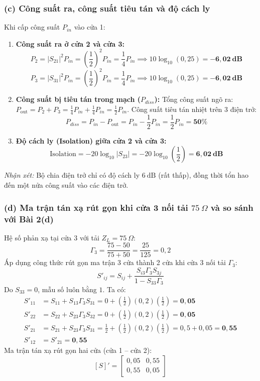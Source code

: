 \documentclass[12pt,a4paper]{article}
\begin{document}
\subsubsection{(c) Công suất ra, công suất tiêu tán và độ cách ly}
Khi cấp công suất $P_{in}$ vào cửa 1:
\begin{enumerate}
    \item \textbf{Công suất ra ở cửa 2 và cửa 3:}
    \[
    P_2 = |S_{21}|^2 P_{in} = \left(\frac{1}{2}\right)^2 P_{in} = \frac{1}{4} P_{in} \implies 10\log_{10}(0{,}25) = \mathbf{-6{,}02~\text{dB}}
    \]
    \[
    P_3 = |S_{31}|^2 P_{in} = \left(\frac{1}{2}\right)^2 P_{in} = \frac{1}{4} P_{in} \implies 10\log_{10}(0{,}25) = \mathbf{-6{,}02~\text{dB}}
    \]
    \item \textbf{Công suất bị tiêu tán trong mạch ($P_{diss}$):}
    Tổng công suất ngõ ra: $P_{\text{out}} = P_2 + P_3 = \frac{1}{4} P_{in} + \frac{1}{4} P_{in} = \frac{1}{2} P_{in}$.
    Công suất tiêu tán nhiệt trên 3 điện trở:
    \[
    P_{diss} = P_{in} - P_{\text{out}} = P_{in} - \frac{1}{2}P_{in} = \frac{1}{2} P_{in} = \mathbf{50\%}
    \]
    \item \textbf{Độ cách ly (Isolation) giữa cửa 2 và cửa 3:}
    \[
    \text{Isolation} = -20 \log_{10}|S_{23}| = -20 \log_{10}\left(\frac{1}{2}\right) = \mathbf{6{,}02~\text{dB}}
    \]
\end{enumerate}
\textit{Nhận xét:} Bộ chia điện trở chỉ có độ cách ly $6~\text{dB}$ (rất thấp), đồng thời tổn hao đến một nửa công suất vào các điện trở.

\subsubsection{(d) Ma trận tán xạ rút gọn khi cửa 3 nối tải $75~\Omega$ và so sánh với Bài 2(d)}
Hệ số phản xạ tại cửa 3 với tải $Z_L = 75~\Omega$:
\[
\Gamma_3 = \frac{75 - 50}{75 + 50} = \frac{25}{125} = 0{,}2
\]
Áp dụng công thức rút gọn ma trận 3 cửa thành 2 cửa khi cửa 3 nối tải $\Gamma_3$:
\[
S'_{ij} = S_{ij} + \frac{S_{i3} \Gamma_3 S_{3j}}{1 - S_{33}\Gamma_3}
\]
Do $S_{33} = 0$, mẫu số luôn bằng $1$. Ta có:
\begin{align*}
S'_{11} &= S_{11} + S_{13}\Gamma_3 S_{31} = 0 + \left(\frac{1}{2}\right)(0{,}2)\left(\frac{1}{2}\right) = \mathbf{0{,}05} \\
S'_{22} &= S_{22} + S_{23}\Gamma_3 S_{32} = 0 + \left(\frac{1}{2}\right)(0{,}2)\left(\frac{1}{2}\right) = \mathbf{0{,}05} \\
S'_{21} &= S_{21} + S_{23}\Gamma_3 S_{31} = \frac{1}{2} + \left(\frac{1}{2}\right)(0{,}2)\left(\frac{1}{2}\right) = 0{,}5 + 0{,}05 = \mathbf{0{,}55} \\
S'_{12} &= S'_{21} = \mathbf{0{,}55}
\end{align*}
Ma trận tán xạ rút gọn hai cửa (cửa 1 -- cửa 2):
\[
\boxed{[S]' = \begin{bmatrix} 0{,}05 & 0{,}55 \\ 0{,}55 & 0{,}05 \end{bmatrix}}
\]
\end{document}
